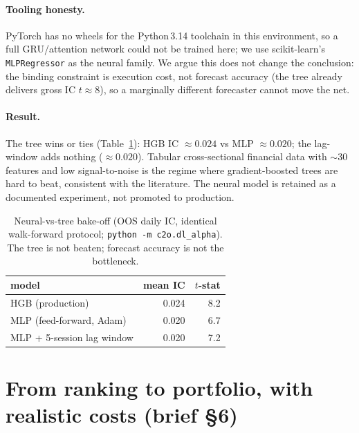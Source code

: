 \documentclass[11pt,a4paper]{article}
\newcommand{\code}[1]{\texttt{#1}}
\newcommand{\dlHGB}{0.024}
\newcommand{\dlMLP}{0.020}
\newcommand{\dlMLPseq}{0.020}
\begin{document}
\paragraph{Tooling honesty.} PyTorch has no wheels for the Python\,3.14 toolchain in this environment, so a full
GRU/attention network could not be trained here; we use scikit-learn's \code{MLPRegressor} as the neural family.
We argue this does not change the conclusion: the binding constraint is execution cost, not forecast accuracy
(the tree already delivers gross IC $t\approx8$), so a marginally different forecaster cannot move the net.
\paragraph{Result.} The tree wins or ties (Table~\ref{tab:dl}): HGB IC $\approx\dlHGB$ vs MLP $\approx\dlMLP$;
the lag-window adds nothing ($\approx\dlMLPseq$). Tabular cross-sectional financial data with $\sim$30 features
and low signal-to-noise is the regime where gradient-boosted trees are hard to beat, consistent with the
literature. The neural model is retained as a documented experiment, not promoted to production.

\begin{table}[h]\centering\small
\caption{Neural-vs-tree bake-off (OOS daily IC, identical walk-forward protocol; \code{python -m c2o.dl\_alpha}).
The tree is not beaten; forecast accuracy is not the bottleneck.}\label{tab:dl}
\begin{tabular}{lrr}
\toprule
model & mean IC & $t$-stat\\
\midrule
HGB (production) & \dlHGB & 8.2\\
MLP (feed-forward, Adam) & \dlMLP & 6.7\\
MLP + 5-session lag window & \dlMLPseq & 7.2\\
\bottomrule
\end{tabular}
\end{table}

\section{From ranking to portfolio, with realistic costs (brief §6)}
\end{document}
